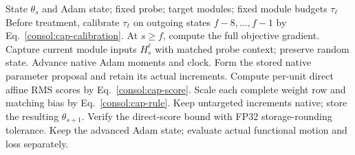 \begin{algorithm}[H]
\caption{Past-calibrated local affine-displacement cap}
\label{consol:algorithm-cap}
\begin{algorithmic}[1]
\Require State $\theta_s$ and Adam state; fixed probe; target modules; fixed module budgets $\tau_\ell$
\State Before treatment, calibrate $\tau_\ell$ on outgoing states $f-8,\ldots,f-1$ by Eq.~\eqref{consol:cap-calibration}.
\State At $s\ge f$, compute the full objective gradient.
\State Capture current module inputs $H_s^\ell$ with matched probe context; preserve random state.
\State Advance native Adam moments and clock.
\State Form the stored native parameter proposal and retain its actual increments.
  \State Compute per-unit direct affine RMS scores by Eq.~\eqref{consol:cap-score}.
  \State Scale each complete weight row and matching bias by Eq.~\eqref{consol:cap-rule}.
\EndFor
\State Keep untargeted increments native; store the resulting $\theta_{s+1}$.
\State Verify the direct-score bound with FP32 storage-rounding tolerance.
\State Keep the advanced Adam state; evaluate actual functional motion and loss separately.
\end{algorithmic}
\end{algorithm}
